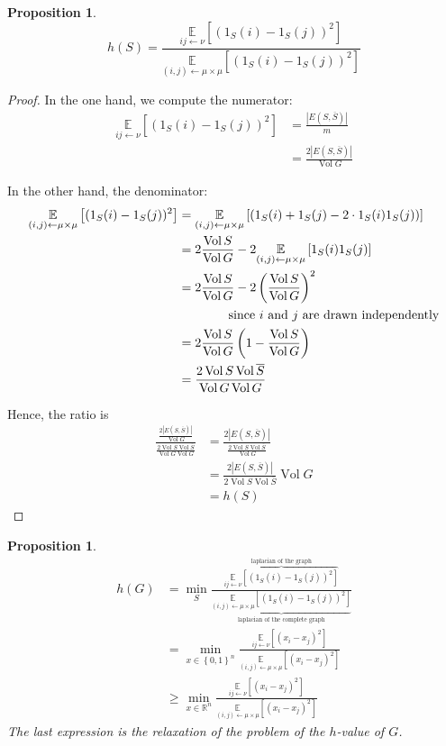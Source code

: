 \documentclass[12pt]{article}
\newtheorem{proposition}[lemma]{Proposition}
\newcommand{\EE}{\mathbb{E}}
\newcommand{\RR}{\mathbb{R}}
\newcommand{\set}[1]{\left\{ #1 \right\}}
\newcommand{\la}{\leftarrow}
\newcommand{\card}[1]{\left\lvert#1\right\rvert}
\newcommand{\esp}[2][]{\underset{#1}{\EE}\left[ #2 \right]}
\DeclareMathOperator{\vol}{Vol}
\begin{document}
\begin{proposition}
    \[
        h(S) = \frac{\esp[ij\la \nu]{(1_S(i)-1_S(j))^2}}{\esp[(i,j)\la\mu\times\mu]{(1_S(i)-1_S(j))^2}}
    \]
\end{proposition}
\begin{proof}
    In the one hand, we compute the numerator:
    \[
        \begin{aligned}
            \esp[ij\la\nu]{(1_S(i)-1_S(j))^2} &= \frac{\card{E(S,\overline{S})}}{m}\\
            &= \frac{2\card{E(S,\overline{S})}}{\vol G}
        \end{aligned}
    \]
    
    In the other hand, the denominator:
    \[
        \begin{aligned}
            \esp[(i,j)\la\mu\times\mu]{(1_S(i)-1_S(j))^2} &= \esp[(i,j)\la\mu\times\mu]{(1_S(i)+1_S(j)-2\cdot 1_S(i)1_S(j))}\\
            &= 2 \frac{\vol S}{\vol G} -2\esp[(i,j)\la\mu\times\mu]{1_S(i)1_S(j)}\\
            &=2\frac{\vol S}{\vol G} - 2 \left( \frac{\vol S}{\vol G}\right)^2\\
            &\text{\qquad\qquad since }i\text{ and }j\text{ are drawn independently}\\
            &= 2 \frac{\vol S}{\vol G}\left( 1- \frac{\vol S}{\vol G}\right)\\
            &= \frac{2 \vol S \vol \overline{S}}{\vol G \vol G}
        \end{aligned}
    \]
    
    Hence, the ratio is
    \[
        \begin{aligned}
            \frac{\frac{2\card{E(S,\overline{S})}}{\vol G}}{\frac{2 \vol S \vol \overline{S}}{\vol G \vol G}} &= \frac{2\card{E(S,\overline{S})}}{\frac{2 \vol S \vol \overline{S}}{\vol G}}\\
            &= \frac{2\card{E(S,\overline{S})}}{2 \vol S \vol \overline{S}}\vol G\\
            &= h(S)
        \end{aligned}
    \]
\end{proof}

\begin{proposition}
    \[
        \begin{aligned}
            h(G) &= \min\limits_{S} \frac{\overbrace{\esp[ij\la \nu]{(1_S(i)-1_S(j))^2}}^{\text{laplacian of the graph}}}{\underbrace{\esp[(i,j)\la\mu\times\mu]{(1_S(i)-1_S(j))^2}}_{\text{laplacian of the complete graph}}}\\
            &=\min\limits_{x\in\set{0,1}^n} \frac{\esp[ij\la\nu]{(x_i-x_j)^2}}{\esp[(i,j)\la\mu\times\mu]{(x_i-x_j)^2}}\\
            &\geqslant \min\limits_{x\in\RR^n} \frac{\esp[ij\la\nu]{(x_i-x_j)^{2}}}{\esp[(i,j)\la\mu\times\mu]{(x_i-x_j)^2}}
        \end{aligned}
    \]
    The last expression is the relaxation of the problem of the $h$-value of $G$.
\end{proposition}
\end{document}
